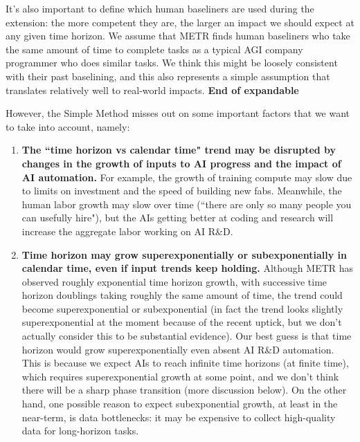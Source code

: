 \documentclass{article}
\theoremstyle{definition}
\begin{document}
It’s also important to define which human baseliners are used during the extension: the more competent they are, the larger an impact we should expect at any given time horizon. We assume that METR finds human baseliners who take the same amount of time to complete tasks as a typical AGI company programmer who does similar tasks. We think this might be loosely consistent with their past baselining, and this also represents a simple assumption that translates relatively well to real-world impacts. \textbf{End of expandable}

However, the Simple Method misses out on some important factors that we want to take into account, namely:
\begin{enumerate}
\item \textbf{The ``time horizon vs calendar time" trend may be disrupted by changes in the growth of inputs to AI progress and the impact of AI automation.} For example, the growth of training compute may slow due to limits on investment and the speed of building new fabs. Meanwhile, the human labor growth may slow over time (``there are only so many people you can usefully hire"), but the AIs getting better at coding and research will increase the aggregate labor working on AI R\&D.
\item \textbf{Time horizon may grow superexponentially or subexponentially in calendar time, even if input trends keep holding.} Although METR has observed roughly exponential time horizon growth, with successive time horizon doublings taking roughly the same amount of time, the trend could become superexponential or subexponential (in fact the trend looks slightly superexponential at the moment because of the recent uptick, but we don't actually consider this to be substantial evidence). Our best guess is that time horizon would grow superexponentially even absent AI R\&D automation. This is because we expect AIs to reach infinite time horizons (at finite time), which requires superexponential growth at some point, and we don't think there will be a sharp phase transition (more discussion below). On the other hand, one possible reason to expect subexponential growth, at least in the near-term, is data bottlenecks: it may be expensive to collect high-quality data for long-horizon tasks.
\end{enumerate}
\end{document}
